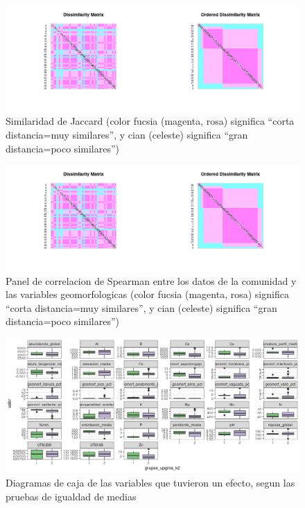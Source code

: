 \documentclass[11pt,]{article}
\begin{document}
\begin{figure}
\centering
\includegraphics[width=1.00000\textwidth]{Similaridad.png}
\caption{Similaridad de Jaccard (color fucsia (magenta, rosa) significa
``corta distancia=muy similares'', y cian (celeste) significa ``gran
distancia=poco similares'')\label{fig:similaridad_jaccard}}
\end{figure}

\begin{figure}
\centering
\includegraphics[width=1.00000\textwidth]{Similaridad.png}
\caption{Panel de correlacion de Spearman entre los datos de la
comunidad y las variables geomorfologicas (color fucsia (magenta, rosa)
significa ``corta distancia=muy similares'', y cian (celeste) significa
``gran distancia=poco
similares'')\label{fig:matriz_correlacion_geomorf_abun_riq_spearman}}
\end{figure}

\begin{figure}
\centering
\includegraphics[width=1.00000\textwidth]{actualizacion2_grupos_upgma.png}
\caption{Diagramas de caja de las variables que tuvieron un efecto,
segun las pruebas de igualdad de medias\label{fig:grupos_upgma}}
\end{figure}
\end{document}
